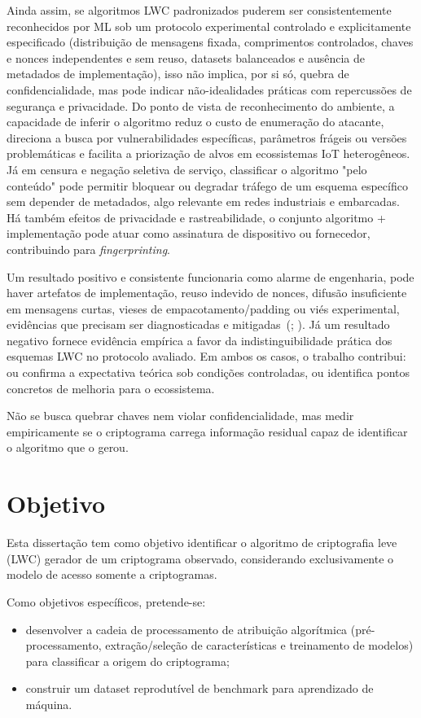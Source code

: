 Ainda assim, se algoritmos LWC padronizados puderem ser consistentemente
reconhecidos por ML sob um protocolo experimental controlado e explicitamente
especificado (distribuição de mensagens fixada, comprimentos controlados, chaves
e nonces independentes e sem reuso, datasets balanceados e ausência de metadados
de implementação), isso não implica, por si só, quebra de confidencialidade, mas
pode indicar não-idealidades práticas com repercussões de segurança e
privacidade. Do ponto de vista de reconhecimento do ambiente, a capacidade de
inferir o algoritmo reduz o custo de enumeração do atacante, direciona a busca
por vulnerabilidades específicas, parâmetros frágeis ou versões problemáticas e
facilita a priorização de alvos em ecossistemas IoT heterogêneos. Já em censura
e negação seletiva de serviço, classificar o algoritmo "pelo conteúdo"  pode
permitir bloquear ou degradar tráfego de um esquema específico sem depender de
metadados, algo relevante em redes industriais e embarcadas. Há também efeitos
de privacidade e rastreabilidade, o conjunto algoritmo + implementação pode
atuar como assinatura de dispositivo ou fornecedor, contribuindo para
\emph{fingerprinting}.

Um resultado positivo e consistente funcionaria como alarme de engenharia, pode
haver artefatos de implementação, reuso indevido de nonces, difusão insuficiente
em mensagens curtas, vieses de empacotamento/padding ou viés experimental,
evidências que precisam ser diagnosticadas e
mitigadas~(\cite{Turan2023NISTLWCFinal};
\cite{Dobraunig2021AsconSecurity}). Já um resultado negativo fornece evidência
empírica a favor da indistinguibilidade prática dos esquemas LWC no protocolo
avaliado. Em ambos os casos, o trabalho contribui: ou confirma a expectativa
teórica sob condições controladas, ou identifica pontos concretos de melhoria
para o ecossistema.

Não se busca quebrar chaves nem violar confidencialidade, mas medir
empiricamente se o criptograma carrega informação residual capaz de identificar
o algoritmo que o gerou.

\section{Objetivo}

Esta dissertação tem como objetivo identificar o algoritmo de criptografia leve (LWC) gerador de um criptograma observado, considerando exclusivamente o modelo de acesso somente a criptogramas.

Como objetivos específicos, pretende-se:
\begin{itemize}
    \item desenvolver a cadeia de processamento de atribuição algorítmica
    (pré-processamento, extração/seleção de características e treinamento de
    modelos) para classificar a origem do criptograma;
    \item construir um dataset reprodutível de benchmark para aprendizado de
    máquina.
\end{itemize}